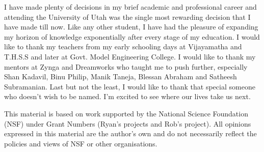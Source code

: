 I have made plenty of decisions in my brief academic and professional career and attending the University of Utah was the single most rewarding decision that I have made till now.
Like any other student, I have had the pleasure of expanding my horizon of knowledge exponentially after every stage of my education.
I would like to thank my teachers from my early schooling days at Vijayamatha and T.H.S.S and later at Govt. Model Engineering College.
I would like to thank my mentors at Zynga and Dreamworks who taught me to push further, especially Shan Kadavil, Binu Philip, Manik Taneja, Blessan Abraham and Satheesh Subramanian.
Last but not the least, I would like to thank that special someone who doesn't wish to be named. I'm excited to see where our lives take us next. 

This material is based on work supported by the National Science Foundation (NSF)  under Grant Numbers (Ryan's projects and Rob's project).
All opinions expressed in this material are the author's own and do not necessarily reflect the policies and views of NSF or other organisations.